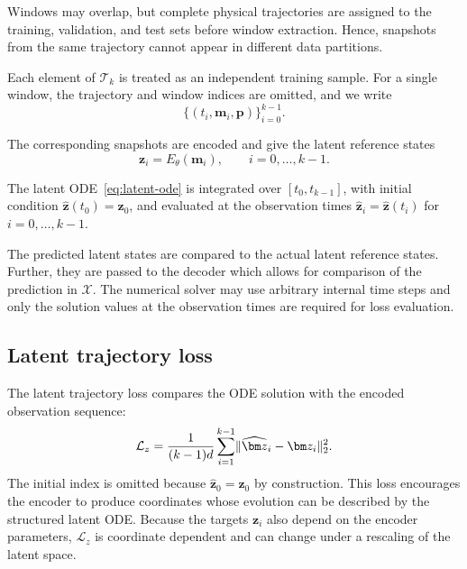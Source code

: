 \documentclass[a4paper,11pt]{article}
\newcommand{\m}{\bm m}
\newcommand{\z}{\bm z}
\newcommand{\p}{\bm p}
\newcommand{\Eenc}{E_{\theta}}
\newcommand{\zhat}{\widehat{\bm z}}
\DeclarePairedDelimiter{\norm}{\lVert}{\rVert}
\begin{document}
Windows may overlap, but complete physical trajectories are assigned to the training, validation, and test sets before window extraction. Hence, snapshots from the same trajectory cannot appear in different data partitions.

Each element of $\mathcal T_k$ is treated as an independent training sample. For a single window, the trajectory and window indices are omitted, and we write
\begin{equation}
\{\left(t_i,\m_i,\p\right)\}_{i=0}^{k-1}.
\end{equation}

The corresponding snapshots are encoded and give the latent reference states 
\begin{equation}
\z_i = \Eenc(\m_i), \qquad i=0,\ldots,k-1.
\end{equation}

The latent ODE~\eqref{eq:latent-ode} is integrated over $[t_0,t_{k-1}]$, with initial condition $\zhat(t_0) = \z_0$, and evaluated at the observation times $\zhat_i = \zhat(t_i)$ for $i=0,\ldots,k-1.$

The predicted latent states are compared to the actual latent reference states. Further, they are passed to the decoder which allows for comparison of the prediction in $\mathcal X$.
The numerical solver may use arbitrary internal time steps and only the solution values at the observation times are required for loss evaluation.

\subsection{Latent trajectory loss}
The latent trajectory loss compares the ODE solution with the encoded
observation sequence:
\begin{equation}
  \mathcal L_z
  =\frac{1}{(k-1)d}
   \sum_{i=1}^{k-1}
   \norm{\zhat_i-\z_i}_2^2.
  \label{eq:latent_loss}
\end{equation}
The initial index is omitted because $\zhat_0=\z_0$ by construction. This loss
encourages the encoder to produce coordinates whose evolution can be described
by the structured latent ODE. Because the targets $\z_i$ also depend on the
encoder parameters, $\mathcal L_z$ is coordinate dependent and can change
under a rescaling of the latent space.
\end{document}
